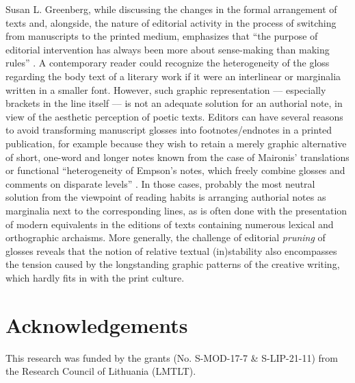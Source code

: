 \begin{paper}
Susan L. Greenberg, while discussing the changes in the formal
arrangement of texts and, alongside, the nature of editorial activity in
the process of switching from manuscripts to the printed medium,
emphasizes that ``the purpose of editorial intervention has always been
more about sense-making than making rules'' \citep[84]{greenberg_poetics_2018}. A
contemporary reader could recognize the heterogeneity of the gloss
regarding the body text of a literary work if it were an interlinear or
marginalia written in a smaller font. However, such graphic
representation –– especially brackets in the line itself –– is not an
adequate solution for an authorial note, in view of the aesthetic
perception of poetic texts. Editors can have several reasons to avoid
transforming manuscript glosses into footnotes/endnotes in a printed
publication, for example because they wish
to retain a merely graphic alternative of short, one-word and longer
notes known from the case of Maironis' translations or functional
``heterogeneity of Empson's notes, which freely combine glosses and
comments on disparate levels'' \citep[212]{dimitrova_decorus_2012}. In those cases, probably the most neutral solution from the viewpoint
of reading habits is arranging authorial notes as marginalia next to the
corresponding lines, as is often done with the presentation of modern
equivalents in the editions of texts containing numerous lexical and
orthographic archaisms. More generally, the challenge of editorial
\emph{pruning} of glosses reveals that the notion of relative textual
(in)stability also encompasses the tension caused by the longstanding
graphic patterns of the creative writing, which hardly fits in with the
print culture.

\section*{Acknowledgements}
This research was funded by the grants (No. S-MOD-17-7 \& S-LIP-21-11) from the Research Council of Lithuania (LMTLT).

\begin{flushleft}
    \renewcommand*{\mkbibnamefamily}[1]{\textsc{#1}}
    \renewcommand*{\mkbibnamegiven}[1]{\textsc{#1}} 
\printbibliography
\end{flushleft}

\end{paper}